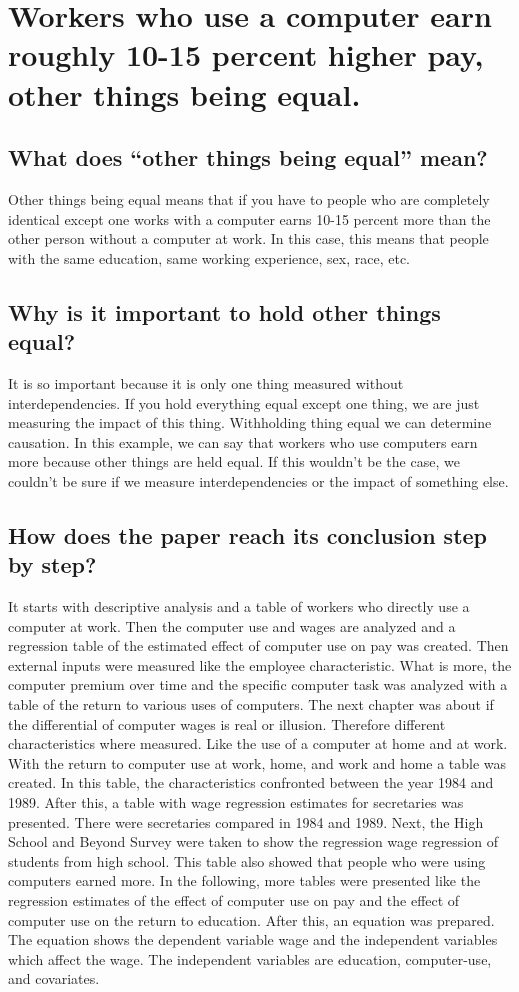 
\chapter{Workers who use a computer earn roughly 10-15 percent higher pay, other things being equal.}

\section{What does “other things being equal” mean? }
Other things being equal means that if you have to people who are completely identical except one works with a computer earns 10-15 percent more than the other person without a computer at work.
In this case, this means that people with the same education, same working experience, sex, race, etc.

\section{Why is it important to hold other things equal?}
It is so important because it is only one thing measured without interdependencies. If you hold everything equal except one thing, we are just measuring the impact of this thing.
Withholding thing equal we can determine causation. In this example, we can say that workers who use computers earn more because other things are held equal. If this wouldn't be the case, we couldn't be sure if we measure interdependencies or the impact of something else.

\section{How does the paper reach its conclusion step by step?}
It starts with descriptive analysis and a table of workers who directly use a computer at work. Then the computer use and wages are analyzed and a regression table of the estimated effect of computer use on pay was created. Then external inputs were measured like the employee characteristic. What is more, the computer premium over time and the specific computer task was analyzed with a table of the return to various uses of computers. The next chapter was about if the differential of computer wages is real or illusion. Therefore different characteristics where measured. Like the use of a computer at home and at work. With the return to computer use at work, home, and work and home a table was created. In this table, the characteristics confronted between the year 1984 and 1989. After this, a table with wage regression estimates for secretaries was presented. There were secretaries compared in 1984 and 1989. Next,  the High School and Beyond Survey were taken to show the regression wage regression of students from high school. This table also showed that people who were using computers earned more. In the following, more tables were presented like the regression estimates of the effect of computer use on pay and the effect of computer use on the return to education. After this, an equation was prepared. The equation shows the dependent variable wage and the independent variables which affect the wage. The independent variables are education, computer-use, and covariates. 

